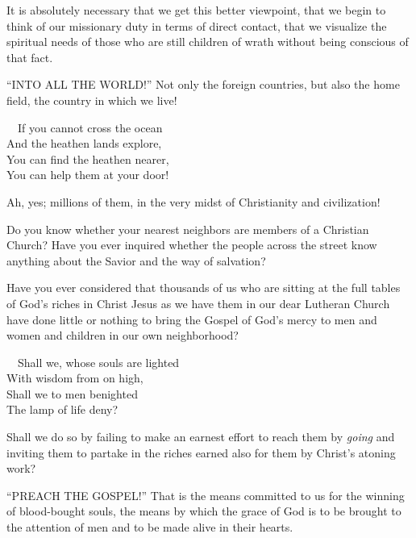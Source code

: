 \documentclass[
]{book}
\begin{document}
It is absolutely necessary that we get this better viewpoint, that we begin to think of our missionary duty in terms of direct contact, that we visualize the spiritual needs of those who are still children of wrath without being conscious of that fact.

``INTO ALL THE WORLD!'' Not only the foreign countries, but also the home field, the country in which we live!

~~If you cannot cross the ocean\\
\hspace*{0.333em}\hspace*{0.333em}And the heathen lands explore,\\
\hspace*{0.333em}\hspace*{0.333em}You can find the heathen nearer,\\
\hspace*{0.333em}\hspace*{0.333em}You can help them at your door!

Ah, yes; millions of them, in the very midst of Christianity and civilization!

Do you know whether your nearest neighbors are members of a Christian Church? Have you ever inquired whether the people across the street know anything about the Savior and the way of salvation?

Have you ever considered that thousands of us who are sitting at the full tables of God's riches in Christ Jesus as we have them in our dear Lutheran Church have done little or nothing to bring the Gospel of God's mercy to men and women and children in our own neighborhood?

~~Shall we, whose souls are lighted\\
\hspace*{0.333em}\hspace*{0.333em}With wisdom from on high,\\
\hspace*{0.333em}\hspace*{0.333em}Shall we to men benighted\\
\hspace*{0.333em}\hspace*{0.333em}The lamp of life deny?

Shall we do so by failing to make an earnest effort to reach them by \emph{going} and inviting them to partake in the riches earned also for them by Christ's atoning work?

``PREACH THE GOSPEL!'' That is the means committed to us for the winning of blood-bought souls, the means by which the grace of God is to be brought to the attention of men and to be made alive in their hearts.
\end{document}
